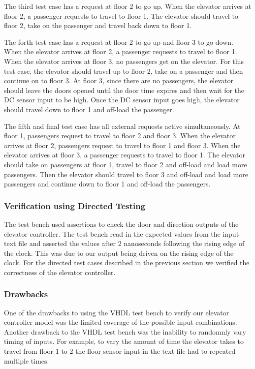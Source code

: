 \documentclass[journal]{IEEEtran}
\begin{document}
The third test case has a request at floor 2 to go up. When the elevator arrives at floor 2, a passenger requests to travel to floor 1. The elevator should travel to floor 2, take on the passenger and travel back down to floor 1.

The forth test case has a request at floor 2 to go up and floor 3 to go down. When the elevator arrives at floor 2, a passenger requests to travel to floor 1. When the elevator arrives at floor 3, no passengers get on the elevator. For this test case, the elevator should travel up to floor 2, take on a passenger and then continue on to floor 3. At floor 3, since there are no passengers, the elevator should leave the doors opened until the door time expires and then wait for the DC sensor input to be high. Once the DC sensor input goes high, the elevator should travel down to floor 1 and off-load the passenger.

The fifth and final test case has all external requests active simultaneously. At floor 1, passengers request to travel to floor 2 and floor 3. When the elevator arrives at floor 2, passengers request to travel to floor 1 and floor 3. When the elevator arrives at floor 3, a passenger requests to travel to floor 1. The elevator should take on passengers at floor 1, travel to floor 2 and off-load and load more passengers. Then the elevator should travel to floor 3 and off-load and load more passengers and continue down to floor 1 and off-load the passengers.

\subsubsection{Verification using Directed Testing}
The test bench used assertions to check the door and direction outputs of the elevator controller. The test bench read in the expected values from the input text file and asserted the values after 2 nanoseconds following the rising edge of the clock. This was due to our output being driven on the rising edge of the clock. For the directed test cases described in the previous section we verified the correctness of the elevator controller.

\subsubsection{Drawbacks}
One of the drawbacks to using the VHDL test bench to verify our elevator controller model was the limited coverage of the possible input combinations. Another drawback to the VHDL test bench was the inability to randomnly vary timing of inputs. For example, to vary the amount of time the elevator takes to travel from floor 1 to 2 the floor sensor input in the text file had to repeated multiple times. 
\end{document}
